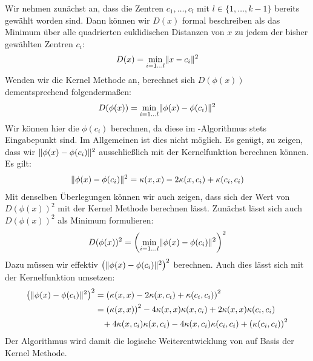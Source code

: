 Wir nehmen zunächst an, dass die Zentren $c_1, \dots, c_l$ mit $l \in \{ 1, \dots, k-1 \}$ bereits gewählt worden sind.
Dann können wir $D(x)$ formal beschreiben als das Minimum über alle quadrierten euklidischen Distanzen von $x$ zu jedem der bisher
gewählten Zentren $c_i$:
\[ D(x) = \min_{i = 1 \dots l} \lVert {x} - {c_i} \rVert^2 \]
Wenden wir die Kernel Methode an, berechnet sich $D(\phi(x))$ dementsprechend folgendermaßen:
\[ D(\phi(x)) = \min_{i = 1 \dots l} \lVert {\phi(x)} - {\phi(c_i)} \rVert^2 \]
Wir können hier die $\phi(c_i)$ berechnen, da diese im \kkmpp-Algorithmus stets Eingabepunkt sind. Im Allgemeinen ist dies
nicht möglich.
Es genügt, zu zeigen, dass wir $\lVert {\phi(x)} - {\phi(c_i)} \rVert^2$ ausschließlich mit der Kernelfunktion berechnen
können.
Es gilt:
\begin{align}
	\lVert {\phi(x)} - {\phi(c_i)} \rVert^2 = \kappa(x,x) - 2 \kappa(x,c_i) + \kappa(c_i,c_i)
\end{align}
Mit denselben Überlegungen können wir auch zeigen, dass sich der Wert von $D(\phi(x))^2$ mit der Kernel Methode berechnen lässt.
Zunächst lässt sich auch $D(\phi(x))^2$ als Minimum formulieren:
\[ D(\phi(x))^2 = \left( \min_{i = 1 \dots l} \lVert {\phi(x)} - {\phi(c_i)} \rVert^2 \right)^2 \]
Dazu müssen wir effektiv $\left( \lVert {\phi(x)} - {\phi(c_i)} \rVert^2 \right)^2$ berechnen. Auch dies lässt sich mit der
Kernelfunktion umsetzen:
\begin{align}
\label{formula:kkmpp}
	\left( \lVert {\phi(x)} - {\phi(c_i)} \rVert^2 \right)^2 &= \left( \kappa(x,x) - 2 \kappa(x,c_i) + \kappa(c_i,c_i) \right)^2 \nonumber \\
	&= \left(\kappa(x,x)\right)^2 - 4 \kappa(x,x) \kappa(x,c_i) + 2 \kappa(x,x) \kappa(c_i,c_i) \nonumber \\
	& \; \; \; + 4 \kappa(x,c_i) \kappa(x,c_i) - 4 \kappa(x,c_i) \kappa(c_i,c_i) + \left(\kappa(c_i,c_i)\right)^2
\end{align}
Der Algorithmus \kkmpp{} wird damit die logische Weiterentwicklung von \kmpp{} auf Basis der Kernel Methode.

